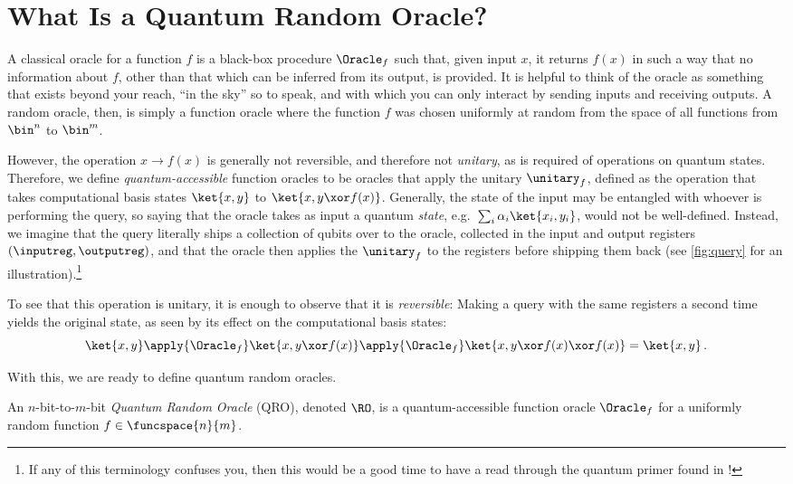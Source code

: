 \section{What Is a Quantum Random Oracle?}\label{sec:defs}
  A classical oracle for a function $f$ is a black-box procedure $\Oracle_f$
    such that, given input $x$, it returns $f(x)$ in such a way that no
    information about $f$, other than that which can be inferred from its
    output, is provided. It is helpful to think of the oracle as something that
    exists beyond your reach, ``in the sky'' so to speak, and with which you can
    only interact by sending inputs and receiving outputs.
    A random oracle, then, is simply a function oracle where the
    function $f$ was chosen uniformly at random from the space of all functions
    from $\bin^n$ to $\bin^m$.

  However, the operation $x \longrightarrow f(x)$ is generally not reversible,
    and therefore not \emph{unitary}, as is required of operations on quantum
    states. Therefore, we define \emph{quantum-accessible} function oracles to be
    oracles that apply the unitary $\unitary_f$, defined as the operation that
    takes computational basis states $\ket{x, y}$ to $\ket{x, y \xor
    f(x)}$. Generally, the state of the input may be entangled with whoever
    is performing the query, so saying that the oracle takes as input a quantum
    \emph{state}, e.g.\ $\sum_i \alpha_i \ket{x_i, y_i}$, would not be
    well-defined. Instead, we imagine that the query literally ships a
    collection of qubits over to the oracle, collected in the input and output
    registers $(\inputreg, \outputreg)$, and that the oracle then applies the
    $\unitary_f$ to the registers before shipping them back
    (see \autoref{fig:query} for an illustration).\footnote{
      If any of this terminology confuses you, then this would be a good time
      to have a read through the quantum primer found in !
    } 

  To see that this operation is unitary, it is enough to observe that it is
    \emph{reversible}: Making a query with the same registers a second time
    yields the original state, as seen by its effect on the computational basis
    states:
    \[ 
      \ket{x, y} \apply{\Oracle_f} \ket{x, y \xor f(x)}
        \apply{\Oracle_f} \ket{x, y \xor f(x) \xor f(x)} = \ket{x, y}\, .
    \]

  \noindent
  With this, we are ready to define quantum random oracles.

  \begin{definition}\label{def:qro}
    An $n$-bit-to-$m$-bit \emph{Quantum Random Oracle} (QRO), denoted $\RO$, is a
    quantum-accessible function oracle $\Oracle_f$ for a uniformly random
    function $f \in \funcspace{n}{m}$.
  \end{definition}

